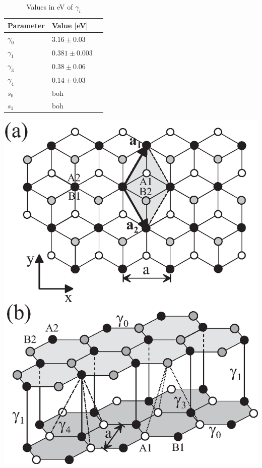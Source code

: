 \begin{table}[ht]
    \begin{minipage}[b]{0.56\linewidth}
    \centering
    \begin{tabular}{ l l r }
        \hline
        Parameter & Value [eV] \\ 
        \hline \hline
        $\gamma_0$ & $3.16\pm0.03$ \\
        $\gamma_1$ & $0.381\pm 0.003$ \\
        $\gamma_3$ & $0.38\pm 0.06$ \\
        $\gamma_4$ & $0.14\pm 0.03$ \\
        $s_0$ & boh\\
        $s_1$ & boh\\
        \hline
       \end{tabular}
        \caption{Values in eV of $\gamma_i$ \cite{kuzmenko2009determination}}
        \label{table:valuetable}
    \end{minipage}\hfill
    \begin{minipage}[b]{0.4\linewidth}
    \centering
    \includegraphics[width=\linewidth]{Immagini/graphene/bilayerlattice.eps}
    \label{fig:bilayer-lattice}
    \end{minipage}
\end{table}

